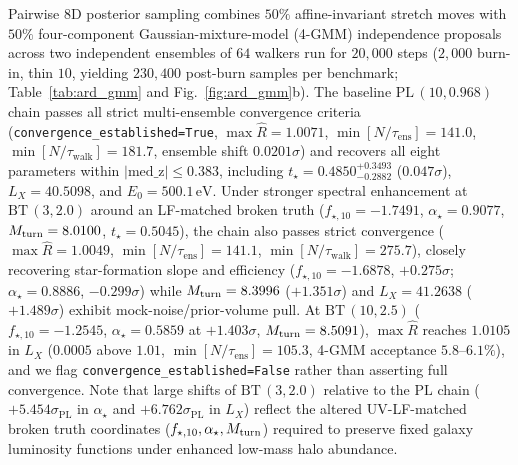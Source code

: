 \documentclass[aps,prd,reprint,superscriptaddress,nofootinbib,amsmath,amssymb,floatfix,longbibliography]{revtex4-2}
\begin{document}
Pairwise 8D posterior sampling combines $50\%$ affine-invariant stretch moves with $50\%$ four-component Gaussian-mixture-model (4-GMM) independence proposals across two independent ensembles of $64$ walkers run for $20{,}000$ steps ($2{,}000$ burn-in, thin $10$, yielding $230{,}400$ post-burn samples per benchmark; Table~\ref{tab:ard_gmm} and Fig.~\ref{fig:ard_gmm}b). The baseline $\mathrm{PL}\,(10, 0.968)$ chain passes all strict multi-ensemble convergence criteria (\texttt{convergence\_established=True}, $\max\widehat{R}=1.0071$, $\min[N/\tau_{\mathrm{ens}}]=141.0$, $\min[N/\tau_{\mathrm{walk}}]=181.7$, ensemble shift $0.0201\sigma$) and recovers all eight parameters within $|\mathrm{med\_z}|\le 0.383$, including $t_\star = 0.4850^{+0.3493}_{-0.2882}$ ($0.047\sigma$), $L_X = 40.5098$, and $E_0 = 500.1\,\mathrm{eV}$. Under stronger spectral enhancement at $\mathrm{BT}\,(3, 2.0)$ around an LF-matched broken truth ($f_{\star,10}=-1.7491$, $\alpha_\star=0.9077$, $M_{\rm turn}=8.0100$, $t_\star=0.5045$), the chain also passes strict convergence ($\max\widehat{R}=1.0049$, $\min[N/\tau_{\mathrm{ens}}]=141.1$, $\min[N/\tau_{\mathrm{walk}}]=275.7$), closely recovering star-formation slope and efficiency ($f_{\star,10}=-1.6878$, $+0.275\sigma$; $\alpha_\star=0.8886$, $-0.299\sigma$) while $M_{\rm turn}=8.3996$ ($+1.351\sigma$) and $L_X=41.2638$ ($+1.489\sigma$) exhibit mock-noise/prior-volume pull. At $\mathrm{BT}\,(10, 2.5)$ ($f_{\star,10}=-1.2545$, $\alpha_\star=0.5859$ at $+1.403\sigma$, $M_{\rm turn}=8.5091$), $\max\widehat{R}$ reaches $1.0105$ in $L_X$ ($0.0005$ above $1.01$, $\min[N/\tau_{\mathrm{ens}}]=105.3$, 4-GMM acceptance $5.8\text{--}6.1\%$), and we flag \texttt{convergence\_established=False} rather than asserting full convergence. Note that large shifts of $\mathrm{BT}\,(3, 2.0)$ relative to the $\mathrm{PL}$ chain ($+5.454\sigma_{\mathrm{PL}}$ in $\alpha_\star$ and $+6.762\sigma_{\mathrm{PL}}$ in $L_X$) reflect the altered UV-LF-matched broken truth coordinates ($f_{\star,10}, \alpha_\star, M_{\rm turn}$) required to preserve fixed galaxy luminosity functions under enhanced low-mass halo abundance.
\end{document}
